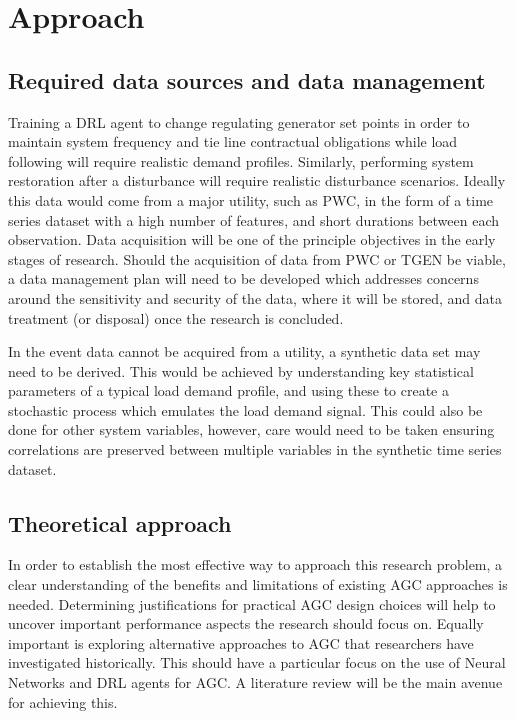 \section{Approach}

\subsection{Required data sources and data management}
Training a DRL agent to change regulating generator set points in order to maintain system frequency and tie line contractual obligations while load following will require realistic demand profiles. Similarly, performing system restoration after a disturbance will require realistic disturbance scenarios. Ideally this data would come from a major utility, such as PWC, in the form of a time series dataset with a high number of features, and short durations between each observation. Data acquisition will be one of the principle objectives in the early stages of research. Should the acquisition of data from PWC or TGEN be viable, a data management plan will need to be developed which addresses concerns around the sensitivity and security of the data, where it will be stored, and data treatment (or disposal) once the research is concluded.

In the event data cannot be acquired from a utility, a synthetic data set may need to be derived. This would be achieved by understanding key statistical parameters of a typical load demand profile, and using these to create a stochastic process which emulates the load demand signal. This could also be done for other system variables, however, care would need to be taken ensuring correlations are preserved between multiple variables in the synthetic time series dataset.

\subsection{Theoretical approach}
In order to establish the most effective way to approach this research problem, a clear understanding of the benefits and limitations of existing AGC approaches is needed. Determining justifications for practical AGC design choices will help to uncover important performance aspects the research should focus on. Equally important is exploring alternative approaches to AGC that researchers have investigated historically. This should have a particular focus on the use of Neural Networks and DRL agents for AGC. A literature review will be the main avenue for achieving this.

